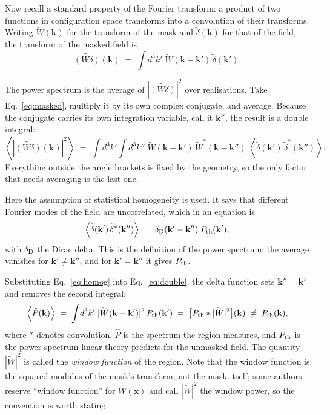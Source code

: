 \documentclass[12pt]{article}
\newcommand{\bk}{\mathbf{k}}
\newcommand{\bx}{\mathbf{x}}
\newcommand{\avg}[1]{\left\langle #1 \right\rangle}
\begin{document}
Now recall a standard property of the Fourier transform: a product of two
functions in configuration space transforms into a convolution of their
transforms. Writing $\widetilde W(\bk)$ for the transform of the mask and
$\widetilde\delta(\bk)$ for that of the field, the transform of the masked field
is
\begin{equation}
  \label{eq:masked}
  \widetilde{(W\delta)}(\bk) \;=\; \int \! d^3k' \; \widetilde W(\bk - \bk')\,
  \widetilde\delta(\bk') .
\end{equation}

The power spectrum is the average of $|\widetilde{(W\delta)}|^2$ over
realisations. Take Eq.~\eqref{eq:masked}, multiply it by its own complex
conjugate, and average. Because the conjugate carries its own integration
variable, call it $\bk''$, the result is a double integral:
\begin{equation}
  \label{eq:double}
  \avg{|\widetilde{(W\delta)}(\bk)|^2} \;=\;
  \int \! d^3k' \int \! d^3k'' \;
  \widetilde W(\bk - \bk')\, \widetilde W^{*}(\bk - \bk'')\;
  \avg{\widetilde\delta(\bk')\,\widetilde\delta^{*}(\bk'')} .
\end{equation}
Everything outside the angle brackets is fixed by the geometry, so the only
factor that needs averaging is the last one.

Here the assumption of statistical homogeneity is used. It says that different
Fourier modes of the field are uncorrelated, which in an equation is
\begin{equation}
  \label{eq:homog}
  \avg{\widetilde\delta(\bk')\,\widetilde\delta^{*}(\bk'')} \;=\;
  \delta_{\rm D}(\bk' - \bk'')\; P_{\rm th}(\bk') ,
\end{equation}
with $\delta_{\rm D}$ the Dirac delta. This is the definition of the power
spectrum: the average vanishes for $\bk' \neq \bk''$, and for $\bk' = \bk''$ it
gives $P_{\rm th}$.

Substituting Eq.~\eqref{eq:homog} into Eq.~\eqref{eq:double}, the delta function
sets $\bk'' = \bk'$ and removes the second integral:
\begin{equation}
  \label{eq:conv}
  \avg{\hat P(\bk)} \;=\; \int \! d^3k' \; |\widetilde W(\bk - \bk')|^2\,
  P_{\rm th}(\bk')
  \;=\; \big[P_{\rm th} \ast |\widetilde W|^2\big](\bk)
  \;\neq\; P_{\rm th}(\bk),
\end{equation}
where $\ast$ denotes convolution, $\hat P$ is the spectrum the region measures,
and $P_{\rm th}$ is the power spectrum linear theory predicts for the unmasked
field. The quantity $|\widetilde W|^2$ is called the \emph{window function} of
the region. Note that the window function is the squared modulus of the mask's
transform, not the mask itself; some authors reserve ``window function'' for
$W(\bx)$ and call $|\widetilde W|^2$ the window power, so the convention is
worth stating.
\end{document}
